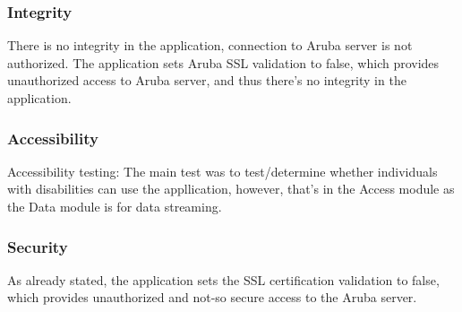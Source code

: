 			\subsubsection{Integrity}
			There is no integrity in the application, connection to Aruba server is not authorized. The application sets Aruba SSL validation to false, which provides unauthorized
			access to Aruba server, and thus there's no integrity in the application.

			\subsubsection{Accessibility}
			Accessibility testing: The main test was to test/determine whether individuals with disabilities can use the appllication, however, that's in the Access module as the Data
			module is for data streaming.

			\subsubsection{Security}
			As already stated, the application sets the SSL certification validation to false, which provides unauthorized and not-so secure access to the Aruba server.
